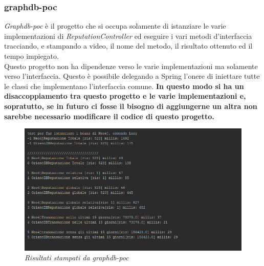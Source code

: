 \subsubsection{graphdb-poc}
\textit{Graphdb-poc} è il progetto che si occupa solamente di istanziare le varie implementazioni di \textit{ReputationController} ed eseguire i vari metodi d'interfaccia tracciando, e stampando a video, il nome del metodo, il risultato ottenuto ed il tempo impiegato.\\
Questo progetto non ha dipendenze verso le varie implementazioni ma solamente verso l'interfaccia. Questo è possibile delegando a Spring l'onere di iniettare tutte le classi che implementano l'interfaccia comune. \textbf{In questo modo si ha un disaccoppiamento tra questo progetto e le varie implementazioni e, sopratutto, se in futuro ci fosse il bisogno di aggiungerne un altra non sarebbe necessario modificare il codice di questo progetto.}
\begin{figure}[!ht]
	\centering
	\includegraphics[scale=0.75]{immagini/poc.png}
	\caption{\textit{Risultati stampati da graphdb-poc}}
\end{figure}
